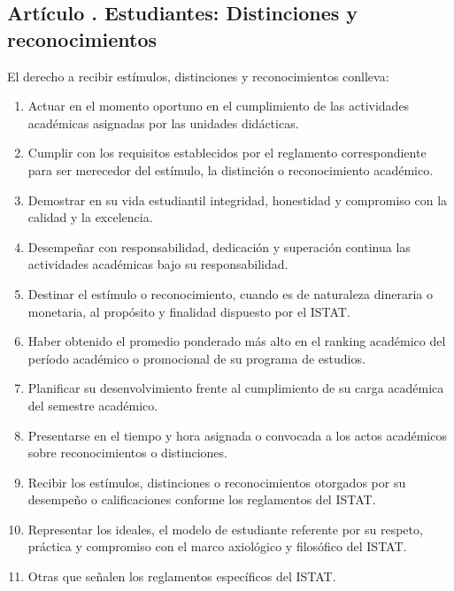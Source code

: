 \subsection{Artículo . Estudiantes: Distinciones y reconocimientos}
\addtocounter{ns}{1}
El derecho a recibir estímulos, distinciones y reconocimientos conlleva: 
\begin{enumerate}
\item Actuar en el momento oportuno en el cumplimiento de las actividades académicas asignadas por las unidades didácticas. 
\item Cumplir con los requisitos establecidos por el reglamento correspondiente para ser merecedor del estímulo, la distinción o reconocimiento académico. 
\item Demostrar en su vida estudiantil integridad, honestidad y compromiso con la calidad y la excelencia. 
\item Desempeñar con responsabilidad, dedicación y superación continua las actividades académicas bajo su responsabilidad. 
\item Destinar el estímulo o reconocimiento, cuando es de naturaleza dineraria o monetaria, al propósito y finalidad dispuesto por el ISTAT. 
\item Haber obtenido el promedio ponderado más alto en el ranking académico del período académico o promocional de su programa de estudios. 
\item Planificar su desenvolvimiento frente al cumplimiento de su carga académica del semestre académico. 
\item Presentarse en el tiempo y hora asignada o convocada a los actos académicos sobre reconocimientos o distinciones. 
\item Recibir los estímulos, distinciones o reconocimientos otorgados por su desempeño o calificaciones conforme los reglamentos del ISTAT. 
\item Representar los ideales, el modelo de estudiante referente por su respeto, práctica y compromiso con el marco axiológico y filosófico del ISTAT. 
\item Otras que señalen los reglamentos específicos del ISTAT.  
\end{enumerate}
